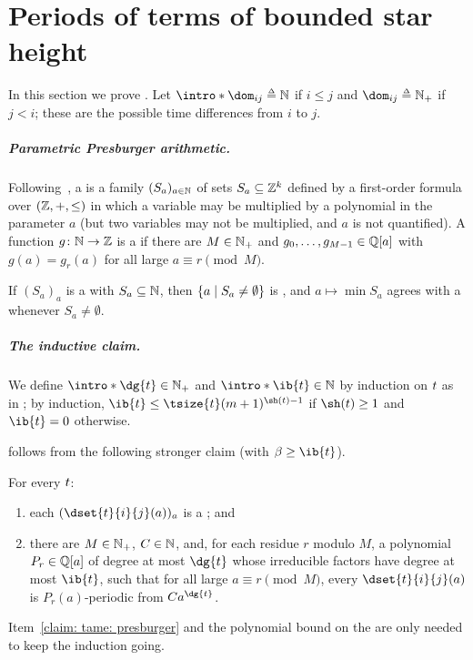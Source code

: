 \section{Periods of terms of bounded star height}\label{section: upper bound}

In this section we prove .
\AP Let $\intro*\dom_{ij} \defeq \nat$ if $i \le j$ and $\dom_{ij} \defeq \pnat$ if $j < i$; these are the possible time differences from  $i$ to  $j$.

\subparagraph*{Parametric Presburger arithmetic.}
\AP Following~\cite{bogartParametricPresburgerArithmetic2017}, a  is a family $(S_a)_{a \in \mathbb{N}}$ of sets $S_a \subseteq \mathbb{Z}^{k}$ defined by a first-order formula over $(\mathbb{Z}, +, \le)$ in which a variable may be multiplied by a polynomial in the parameter $a$ (but two variables may not be multiplied, and $a$ is not quantified).
\AP A function $g \colon \mathbb{N} \to \mathbb{Z}$ is a  if there are $M \in \mathbb{N}_{+}$ and $g_0, \dots, g_{M-1} \in \mathbb{Q}[a]$ with $g(a) = g_{r}(a)$ for all large $a \equiv r \pmod M$.
\begin{theorem}\label{theorem: BGW}
    If $(S_a)_a$ is a  with $S_a \subseteq \mathbb{N}$, then $\{a \mid S_a \neq \emptyset\}$ is , and $a \mapsto \min S_a$ agrees with a  whenever $S_a \neq \emptyset$.
\end{theorem}

\subparagraph*{The inductive claim.}
\AP We define $\intro*\dg{\term} \in \pnat$ and $\intro*\ib{\term} \in \nat$ by induction on $\term$ as in ; by induction, $\ib{\term} \le \tsize{\term} (m+1)^{\sh(\term) - 1}$ if $\sh(\term) \ge 1$ and $\ib{\term} = 0$ otherwise.

 follows from the following stronger claim (with $\beta \ge \ib{\term}$).
\begin{claim}\label{claim: tame}
    For every  $\term$:
    \begin{enumerate}
        \item\label{claim: tame: presburger} each $(\dset{\term}{i}{j}(a))_{a}$ is a ; and
        \item\label{claim: tame: period} there are $M \in \mathbb{N}_{+}$, $C \in \mathbb{N}$, and, for each residue $r$ modulo $M$, a polynomial $P_r \in \mathbb{Q}[a]$ of degree at most $\dg{\term}$ whose irreducible factors have degree at most $\ib{\term}$, such that for all large $a \equiv r \pmod M$, every $\dset{\term}{i}{j}(a)$ is $P_r(a)$-periodic from $C a^{\dg{\term}}$.
    \end{enumerate}
\end{claim}
Item~\ref{claim: tame: presburger} and the polynomial bound on the  are only needed to keep the induction going.

